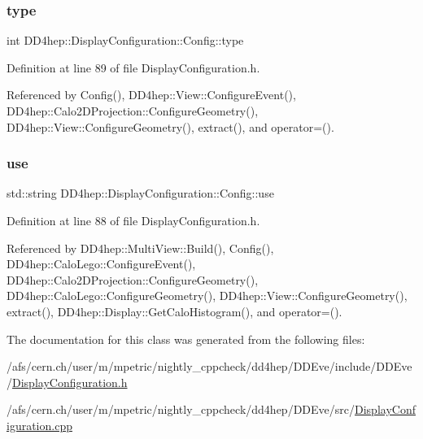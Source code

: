 \subsubsection{\texorpdfstring{type}{type}}
{\footnotesize\ttfamily int D\+D4hep\+::\+Display\+Configuration\+::\+Config\+::type}



Definition at line 89 of file Display\+Configuration.\+h.



Referenced by Config(), D\+D4hep\+::\+View\+::\+Configure\+Event(), D\+D4hep\+::\+Calo2\+D\+Projection\+::\+Configure\+Geometry(), D\+D4hep\+::\+View\+::\+Configure\+Geometry(), extract(), and operator=().

\hypertarget{class_d_d4hep_1_1_display_configuration_1_1_config_a2b092695528d45417dfeeb376993d5cb}{}\label{class_d_d4hep_1_1_display_configuration_1_1_config_a2b092695528d45417dfeeb376993d5cb} 
\subsubsection{\texorpdfstring{use}{use}}
{\footnotesize\ttfamily std\+::string D\+D4hep\+::\+Display\+Configuration\+::\+Config\+::use}



Definition at line 88 of file Display\+Configuration.\+h.



Referenced by D\+D4hep\+::\+Multi\+View\+::\+Build(), Config(), D\+D4hep\+::\+Calo\+Lego\+::\+Configure\+Event(), D\+D4hep\+::\+Calo2\+D\+Projection\+::\+Configure\+Geometry(), D\+D4hep\+::\+Calo\+Lego\+::\+Configure\+Geometry(), D\+D4hep\+::\+View\+::\+Configure\+Geometry(), extract(), D\+D4hep\+::\+Display\+::\+Get\+Calo\+Histogram(), and operator=().



The documentation for this class was generated from the following files\+:\begin{DoxyCompactItemize}
\item 
/afs/cern.\+ch/user/m/mpetric/nightly\+\_\+cppcheck/dd4hep/\+D\+D\+Eve/include/\+D\+D\+Eve/\hyperlink{_display_configuration_8h}{Display\+Configuration.\+h}\item 
/afs/cern.\+ch/user/m/mpetric/nightly\+\_\+cppcheck/dd4hep/\+D\+D\+Eve/src/\hyperlink{_display_configuration_8cpp}{Display\+Configuration.\+cpp}\end{DoxyCompactItemize}
